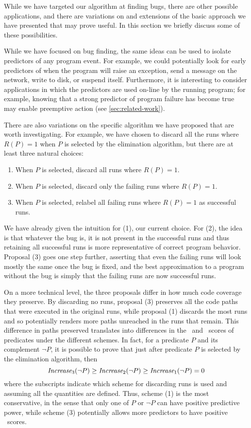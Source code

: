 While we have targeted our algorithm at finding bugs, there are other
possible applications, and there are variations
on and extensions of the basic approach we have presented that may
prove useful.  In this section we briefly discuss some of these
possibilities.

While we have focused on bug finding, the same ideas
can be used to isolate predictors of any program event.  For example,
we could potentially look for early predictors of when the program
will raise an exception, send a message on the network, write to disk,
or suspend itself.  Furthermore, it is interesting to consider
applications in which the predictors are used on-line by the running
program; for example, knowing that a strong predictor of program
failure has become true may enable preemptive action (see
\autoref{sec:related-work}).

There are also variations on the specific algorithm we have proposed
that are worth investigating.  For example, we have chosen to discard
all the runs where $R(P) = 1$ when $P$ is selected by the
elimination algorithm, but there are at least three natural choices:
\begin{enumerate}
\item When $P$ is selected, discard all runs where $R(P) = 1$.

\item When $P$ is selected, discard only the failing runs where $R(P) = 1$.

\item When $P$ is selected, relabel all failing runs where $R(P) = 1$ as successful runs.
\end{enumerate}

We have already given the intuition for (1), our current choice.  For
(2), the idea is that whatever the bug is, it is not present in the
successful runs and thus retaining all successful runs is more
representative of correct program behavior.  Proposal (3) goes one step
further, asserting that even the failing runs will look mostly the same
once the bug is fixed, and the best approximation to a program without the
bug is simply that the failing runs are now successful runs.

On a more technical level, the three proposals differ in how much code
coverage they preserve.  By discarding no runs, proposal (3) preserves
all the code paths that were executed in the original
runs, while proposal (1) discards the most runs and so
potentially renders more paths unreached in the runs that
remain.  This difference in paths preserved translates into differences
in the \crash\ and \context\ scores of predicates under the different schemes.
In fact, for a predicate $P$ and its complement $\neg P$, it is
possible to prove that just after predicate $P$ is selected by the
elimination algorithm, then 
\[ \textit{Increase}_3(\neg P) \geq \textit{Increase}_2(\neg P) \geq \textit{Increase}_1(\neg P) = 0 \]
where the subscripts indicate which scheme for discarding runs is used and
assuming all the quantities are defined.
Thus, scheme (1) is the most conservative, in the sense that only one of $P$
or $\neg P$ can have positive predictive power, while scheme (3) potentially allows more predictors to have positive \increase\ scores.
